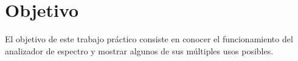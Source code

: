 \documentclass[a4paper,10pt]{article}
\title{  }
\begin{document}
	\maketitle %
	\newpage

	\tableofcontents %
	\newpage


	\section{Objetivo}
	
	\indent	El objetivo de este trabajo pr\'actico consiste en conocer el funcionamiento del analizador de espectro y mostrar algunos de sus m\'ultiples usos posibles.
	
	\newpage
\end{document}
